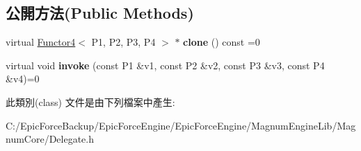 \subsection*{公開方法(Public Methods)}
\begin{DoxyCompactItemize}
\item 
virtual \hyperlink{class_magnum_1_1_functor4}{Functor4}$<$ P1, P2, P3, P4 $>$ $\ast$ {\bfseries clone} () const  =0\hypertarget{class_magnum_1_1_functor4_ae0fb4bd6ca3a2720ed13ac51b9a78db8}{}\label{class_magnum_1_1_functor4_ae0fb4bd6ca3a2720ed13ac51b9a78db8}

\item 
virtual void {\bfseries invoke} (const P1 \&v1, const P2 \&v2, const P3 \&v3, const P4 \&v4)=0\hypertarget{class_magnum_1_1_functor4_ab2546032df41943c2b0d42f444c77286}{}\label{class_magnum_1_1_functor4_ab2546032df41943c2b0d42f444c77286}

\end{DoxyCompactItemize}


此類別(class) 文件是由下列檔案中產生\+:\begin{DoxyCompactItemize}
\item 
C\+:/\+Epic\+Force\+Backup/\+Epic\+Force\+Engine/\+Epic\+Force\+Engine/\+Magnum\+Engine\+Lib/\+Magnum\+Core/Delegate.\+h\end{DoxyCompactItemize}
